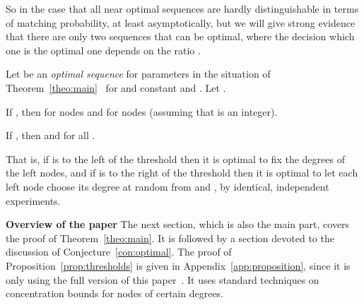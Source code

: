 \let\accentvec\vec \documentclass{llncs}
\begin{document}
So in the case that  all near optimal sequences are hardly distinguishable in terms
of matching probability, at least asymptotically, but we will give strong evidence that there are only two sequences that
can be optimal, where the decision which one is the optimal one depends on the ratio .
\begin{conjecture}
\label{con:optimal}
Let  be an \emph{optimal sequence} for parameters  
in the situation of Theorem~\ref{theo:main}~ for  and constant  and 
. Let .
\begin{compactenum}[]
\item If  , then  for  nodes and  for  nodes 
(assuming that  is an integer).
\item If  , then  and   for all .
\end{compactenum}
\end{conjecture}
That is, if  is to the left of the threshold then it is optimal to fix the degrees of the left nodes, and
if  is to the right of the threshold then it is optimal to let each left node choose its degree at random
from  and , by identical, independent experiments.

\smallskip
\noindent\textbf{Overview of the paper}
The next section, which is also the main part, covers the proof of Theorem~\ref{theo:main}.
It is followed by a section devoted to the discussion of Conjecture~\ref{con:optimal}.
The proof of Proposition~\ref{prop:thresholds} is given in 
\ifnum{}
Appendix~\ref{app:proposition}, since it is only using 
\else
the full version of this paper~\cite[Appendix B]{full_version}. It uses 
\fi
standard techniques on concentration bounds for nodes of certain degrees. 
\end{document}
